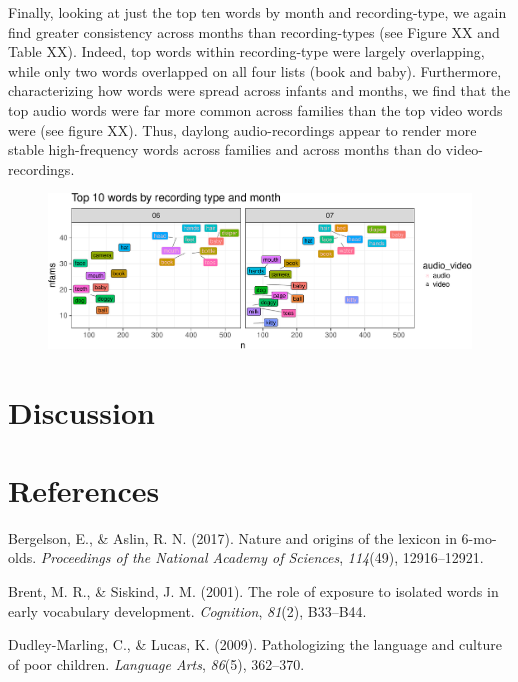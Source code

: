 \documentclass[man]{apa6}
\theoremstyle{definition}
\theoremstyle{definition}
\theoremstyle{definition}
\theoremstyle{remark}
\begin{document}
Finally, looking at just the top ten words by month and recording-type,
we again find greater consistency across months than recording-types
(see Figure XX and Table XX). Indeed, top words within recording-type
were largely overlapping, while only two words overlapped on all four
lists (book and baby). Furthermore, characterizing how words were spread
across infants and months, we find that the top audio words were far
more common across families than the top video words were (see figure
XX). Thus, daylong audio-recordings appear to render more stable
high-frequency words across families and across months than do
video-recordings.

\begin{figure}
\centering
\includegraphics{sixseven_papaja_files/figure-latex/top10noun_freq-1.pdf}
\caption{}
\end{figure}

\section{Discussion}\label{discussion}

\newpage

\section{References}\label{references}

\setlength{\parindent}{-0.5in} \setlength{\leftskip}{0.5in}

\hypertarget{refs}{}
\hypertarget{ref-bergelson2017nature}{}
Bergelson, E., \& Aslin, R. N. (2017). Nature and origins of the lexicon
in 6-mo-olds. \emph{Proceedings of the National Academy of Sciences},
\emph{114}(49), 12916--12921.

\hypertarget{ref-brent2001role}{}
Brent, M. R., \& Siskind, J. M. (2001). The role of exposure to isolated
words in early vocabulary development. \emph{Cognition}, \emph{81}(2),
B33--B44.

\hypertarget{ref-dudley2009pathologizing}{}
Dudley-Marling, C., \& Lucas, K. (2009). Pathologizing the language and
culture of poor children. \emph{Language Arts}, \emph{86}(5), 362--370.
\end{document}
